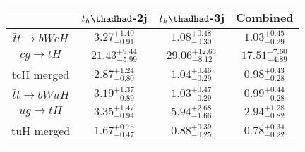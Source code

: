 \centering
\begin{tabular}{cccc} \toprule\toprule
 & $t_h\thadhad$-2j & $t_h\thadhad$-3j & Combined\\\midrule
$\bar{t}t\to bWcH$ & $3.27^{+1.40}_{-0.91}$ & $1.08^{+0.48}_{-0.30}$ & $1.03^{+0.45}_{-0.29}$\\
$cg\to tH$ & $21.43^{+9.44}_{-5.99}$ & $29.06^{+12.63}_{-8.12}$ & $17.51^{+7.60}_{-4.89}$\\
tcH merged & $2.87^{+1.24}_{-0.80}$ & $1.04^{+0.46}_{-0.29}$ & $0.98^{+0.43}_{-0.28}$\\
$\bar{t}t\to bWuH$ & $3.19^{+1.37}_{-0.89}$ & $1.03^{+0.47}_{-0.29}$ & $0.99^{+0.44}_{-0.28}$\\
$ug\to tH$ & $3.35^{+1.47}_{-0.94}$ & $5.94^{+2.68}_{-1.66}$ & $2.94^{+1.28}_{-0.82}$\\
tuH merged & $1.67^{+0.75}_{-0.47}$ & $0.88^{+0.39}_{-0.25}$ & $0.78^{+0.34}_{-0.22}$\\
\bottomrule\bottomrule\\
\end{tabular}

